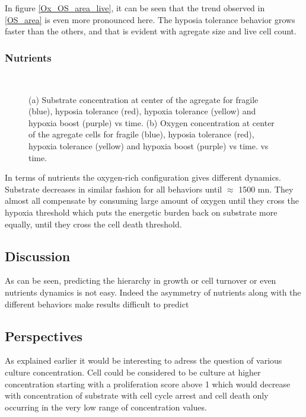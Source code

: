 \documentclass[11pt,a4paper]{article}
\begin{document}
In figure \ref{Ox_OS_area_live}, it can be seen that the trend observed in \ref{OS_area} is even more pronounced here. The hyposia tolerance behavior grows faster than the others, and that is evident with agregate size and live cell count.\\

\subsubsection{Nutrients}
\begin{figure}[h]
\begin{subfigure}{0.5\textwidth}
	\centering
	
	\caption{ \label{Ox_OS_S_ctr}}
\end{subfigure}
~~
\begin{subfigure}{0.5\textwidth}
	\centering
	
	\caption{\label{Ox_OS_O_ctr}}
\end{subfigure}
\caption{(a) Substrate concentration at center of the agregate for fragile (blue), hyposia tolerance (red), hypoxia tolerance (yellow) and hypoxia boost (purple) vs time. (b) Oxygen concentration at center of the agregate cells for fragile (blue), hyposia tolerance (red), hypoxia tolerance (yellow) and hypoxia boost (purple) vs time. vs time. \label{Ox_OS_SO_ctr}}
\end{figure}

In terms of nutrients the oxygen-rich configuration gives different dynamics. Substrate decreases in similar fashion for all behaviors until $\approx$ 1500 mn. They almost all compensate by consuming large amount of oxygen until they cross the hypoxia threshold which puts the energetic burden back on substrate more equally, until they cross the cell death threshold.

\subsection{Discussion}
As can be seen, predicting the hierarchy in growth or cell turnover or even nutrients dynamics is not easy. Indeed the asymmetry of nutrients along with the different behaviors make results difficult to predict

\subsection{Perspectives}
As explained earlier it would be interesting to adress the question of various culture concentration. Cell could be considered to be culture at higher concentration starting with a proliferation score above 1 which would decrease with concentration of substrate with cell cycle arrest and cell death only occurring in the very low range of concentration values.
\newpage


\end{document}
